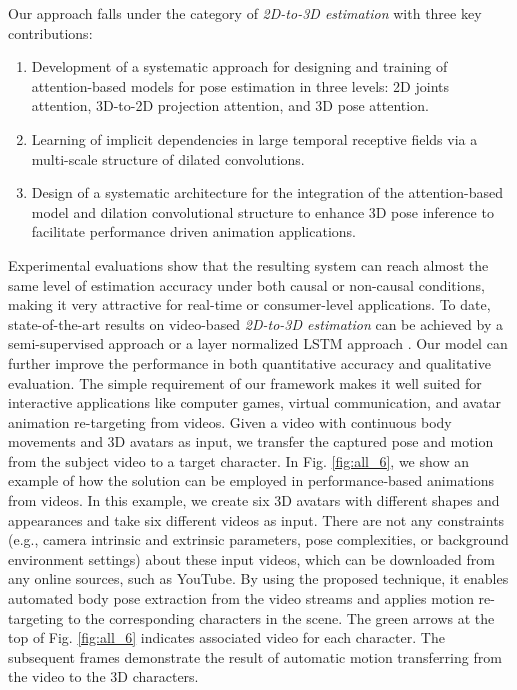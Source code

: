 \documentclass[twocolumn]{svjour3}          \smartqed  \usepackage{graphicx}
\begin{document}
Our approach falls under the category of \emph{2D-to-3D estimation} with three key contributions:
\begin{enumerate}
\item  Development of a systematic approach for designing and training of attention-based models for pose estimation in three levels: 2D joints attention, 3D-to-2D projection attention, and 3D pose attention.
\item  Learning of implicit dependencies in large temporal receptive fields via a multi-scale structure of dilated convolutions. 
\item  Design of a systematic architecture for the integration of the attention-based model and dilation convolutional structure to enhance 3D pose inference to facilitate performance driven animation applications.  
\end{enumerate}


Experimental evaluations show that the resulting system can reach almost the same level of estimation accuracy under both causal or non-causal conditions, making it very attractive for real-time or consumer-level applications. To date, state-of-the-art results on video-based \emph{2D-to-3D estimation} can be achieved by a semi-supervised approach \citep{Pavllo2019} or a layer normalized LSTM approach \citep{Hossain2018}. Our model can further improve the performance in both quantitative accuracy and qualitative evaluation. The simple requirement of our framework makes it well suited for interactive applications like computer games, virtual communication, and avatar animation re-targeting from videos. Given a video with continuous body movements and 3D avatars as input, we transfer the captured pose and motion from the subject video to a target character. In Fig. \ref{fig:all_6}, we show an example of how the solution can be employed in performance-based animations from videos. In this example, we create six 3D avatars with different shapes and appearances and take six different videos as input. There are not any constraints (e.g., camera intrinsic and extrinsic parameters, pose complexities, or background environment settings) about these input videos, which can be downloaded from any online sources, such as YouTube. By using the proposed technique, it enables automated body pose extraction from the video streams and applies motion re-targeting to the corresponding characters in the scene. The green arrows at the top of Fig. \ref{fig:all_6} indicates associated video for each character. The subsequent frames demonstrate the result of automatic motion transferring from the video to the 3D characters.
\end{document}
